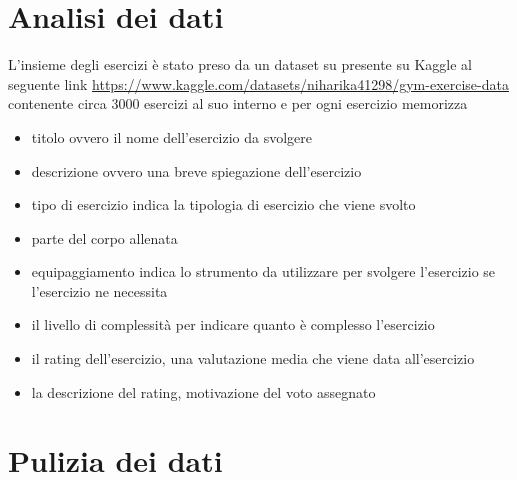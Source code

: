 \documentclass{book}
\begin{document}
\section{Analisi dei dati}
L'insieme degli esercizi è stato preso da un dataset su presente su Kaggle al seguente link \href{https://www.kaggle.com/datasets/niharika41298/gym-exercise-data}{https://www.kaggle.com/datasets/niharika41298/gym-exercise-data} contenente circa 3000 esercizi al suo interno e per ogni esercizio memorizza
\begin{itemize}
    \item titolo ovvero il nome dell'esercizio da svolgere
    \item descrizione ovvero una breve spiegazione dell'esercizio
    \item tipo di esercizio indica la tipologia di esercizio che viene svolto
    \item parte del corpo allenata
    \item equipaggiamento indica lo strumento da utilizzare per svolgere l'esercizio se l'esercizio ne necessita
    \item il livello di complessità per indicare quanto è complesso l'esercizio 
    \item il rating dell’esercizio, una valutazione media che viene data all'esercizio
    \item la descrizione del  rating, motivazione del voto assegnato
    
\end{itemize}
\newline

\section{Pulizia dei dati}
\end{document}
